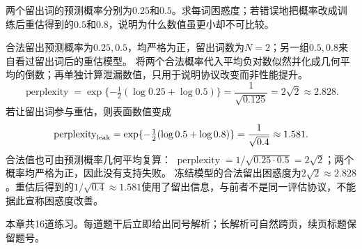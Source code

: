 \begin{example}[留出困惑度]\label{exm:V5-C06-perplexity}
两个留出词的预测概率分别为$0.25$和$0.5$。求每词困惑度；若错误地把概率改成训练后重估得到的$0.5$和$0.8$，说明为什么数值虽更小却不可比较。
\end{example}
\begin{solution}
\SolGiven 合法留出预测概率为$0.25,0.5$，均严格为正，留出词数为$N=2$；另一组$0.5,0.8$来自看过留出词后的重估模型。
\SolPlan 将两个合法概率代入平均负对数似然并化成几何平均的倒数；再单独计算泄漏数值，只用于说明协议改变而非性能提升。
\SolDerive
\[
\operatorname{perplexity}
=\exp\{-\tfrac12(\log0.25+\log0.5)\}
=\frac1{\sqrt{0.125}}=2\sqrt2\approx2.828.
\]
若让留出词参与重估，则表面数值变成
\[
\operatorname{perplexity}_{\rm leak}
=\exp\{-\tfrac12(\log0.5+\log0.8)\}
=\frac1{\sqrt{0.4}}\approx1.581.
\]
\SolCheck 合法值也可由预测概率几何平均复算：
$\operatorname{perplexity}=1/\sqrt{0.25\cdot0.5}=2\sqrt2$；两个概率均严格为正，因此没有支持失败。
\SolAnswer 冻结模型的合法留出困惑度为$2\sqrt2\approx2.828$。重估后得到的$1/\sqrt{0.4}\approx1.581$使用了留出信息，与前者不是同一评估协议，不能据此宣称困惑度改善。
\end{solution}

\label{struct:V5-C06-CH33}
\label{struct:V5-C06-CH34}
\begin{chapterexercisebox}
\label{struct:V5-C06-CH35}
本章共16道练习。每道题干后立即给出同号解析；长解析可自然跨页，续页标题保留题号。
\end{chapterexercisebox}

